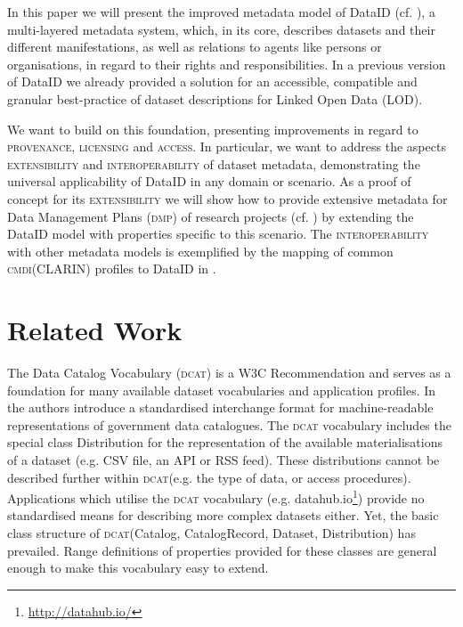 \documentclass[runningheads,a4paper]{llncs}
\newcommand{\provenance}{{\scshape provenance}\xspace}
\newcommand{\licensing}{{\scshape licensing}\xspace}
\newcommand{\access}{{\scshape access}\xspace}
\newcommand{\extensibility}{{\scshape extensibility}\xspace}
\newcommand{\interoperability}{{\scshape interoperability}\xspace}
\newcommand{\cmdi}{{\scshape cmdi}\xspace}
\newcommand{\dcat}{{\scshape dcat}\xspace}
\newcommand{\dmp}{{\scshape dmp}\xspace}
\newcommand\footnoteurl[1]{\footnote{\scriptsize\url{#1}}}
\begin{document}
In this paper we will present the improved metadata model of DataID (cf. ), a multi-layered metadata system, which, in its core, describes datasets and their different manifestations, as well as relations to agents like persons or organisations, in regard to their rights and responsibilities.
In a previous version of DataID\cite{dataID2014} we already provided a solution for an accessible, compatible and granular best-practice of dataset descriptions for Linked Open Data (LOD).

We want to build on this foundation, presenting improvements in regard to \provenance, \licensing and \access. In particular, we want to address the aspects \extensibility and \interoperability of dataset metadata, demonstrating the universal applicability of DataID in any domain or scenario.
As a proof of concept for its \extensibility we will show how to provide extensive metadata for Data Management Plans (\dmp) of research projects (cf. ) by extending the DataID model with properties specific to this scenario.
The \interoperability with other metadata models is exemplified by the mapping of common \cmdi (CLARIN) profiles to DataID in .

\section{Related Work}
\label{related}
The Data Catalog Vocabulary (\dcat) is a W3C Recommendation \cite{ddcat} and serves as a foundation for many available dataset vocabularies and application profiles.
In \cite{MaaliCP10} the authors introduce a standardised interchange format for machine-readable representations of government data catalogues.
The \dcat vocabulary includes the special class Distribution
for the representation of the available materialisations of a
dataset (e.g. CSV file, an API or RSS feed). These distributions cannot be described further within \dcat (e.g. the type of data, or access procedures).
Applications which utilise the \dcat vocabulary (e.g. datahub.io\footnoteurl{http://datahub.io/}) provide no standardised means for describing more complex datasets either.
Yet, the basic class structure of \dcat (Catalog, CatalogRecord, Dataset, Distribution) has prevailed. Range definitions of properties provided for these classes are general enough to make this vocabulary easy to extend.
\end{document}
